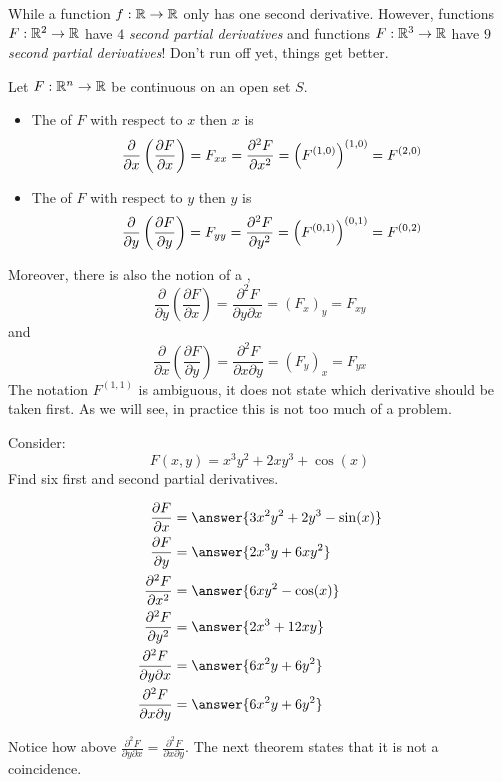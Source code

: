 \documentclass{ximera}
\begin{document}
While a function $f:\R\to\R$ only has one second derivative. However,
functions $F:\R^2\to \R$ have $4$ \textit{second partial derivatives}
and functions $F:\R^3\to\R$ have $9$ \textit{second partial
  derivatives}! Don't run off yet, things get better.

\begin{definition}
  Let $F:\R^n\to\R$ be continuous on an open set $S$.
  \begin{itemize}
  \item The  of $F$ with respect to $x$ then $x$ is
    \[
    \pp{x}\left(\pp[F]{x}\right) = F_{xx}=\frac{\partial^2 F}{\partial x^2} = \left(F^{(1,0)}\right)^{(1,0)}= F^{(2,0)}
    \]
  \item The  of $F$ with respect to
    $y$ then $y$ is
    \[
    \pp{y}\left(\pp[F]{y}\right) = F_{yy}=\frac{\partial^2F}{\partial y^2} = \left(F^{(0,1)}\right)^{(0,1)} = F^{(0,2)}
    \]
\end{itemize}
Moreover, there is also the notion of
a ,
\[
\frac{\partial}{\partial y}\left(\frac{\partial F}{\partial x}\right) = \frac{\partial^2F}{\partial y\partial x} = \left(F_x\right)_y = F_{xy}
\]
and
\[
\frac{\partial}{\partial x}\left(\frac{\partial F}{\partial y}\right) = \frac{\partial^2F}{\partial x\partial y} = \left(F_y\right)_x =F_{yx}
\]
The notation $F^{(1,1)}$ is ambiguous, it does not state which
derivative should be taken first. As we will see, in practice this is
not too much of a problem.
\end{definition}


\begin{question}
  Consider:
  \[
  F(x,y) = x^3y^2 + 2xy^3+\cos(x)
  \]
  Find six first and second partial derivatives.
  \begin{prompt}
    \begin{align*}
      \pp[F]{x} &= \answer{3x^2y^2+2y^3-\sin(x)}\\
      \pp[F]{y} &= \answer{2x^3y+6xy^2}\\
      \frac{\partial^2F}{\partial x^2} &= \answer{6xy^2-\cos(x)}\\
      \frac{\partial^2F}{\partial y^2} &= \answer{2x^3+12xy}\\
      \frac{\partial^2F}{\partial y\partial x} &= \answer{6x^2y+6y^2}\\
      \frac{\partial^2F}{\partial x\partial y} &= \answer{6x^2y+6y^2}
    \end{align*}
  \end{prompt}
\end{question}
Notice how above $\frac{\partial^2F}{\partial y\partial
  x}=\frac{\partial^2F}{\partial x\partial y}$. The next theorem states
that it is not a coincidence.
\end{document}
